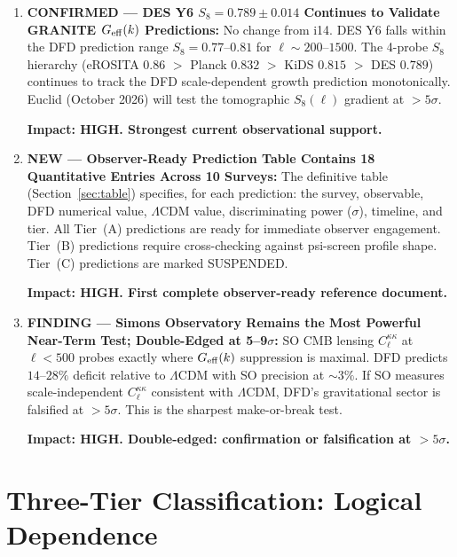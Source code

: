 \documentclass[11pt,a4paper]{article}
\newcommand{\LCDM}{$\Lambda$CDM}
\newcommand{\Geff}{G_{\rm eff}}
\begin{document}
\begin{findbox}
\begin{enumerate}
  \textbf{Impact: CRITICAL. The decisive falsification/confirmation test.}

\item \textbf{CONFIRMED --- DES Y6 $S_8 = 0.789 \pm 0.014$ Continues
  to Validate GRANITE $\Geff(k)$ Predictions:}
  No change from i14. DES Y6 falls within the DFD prediction range
  $S_8 = 0.77$--$0.81$ for $\ell \sim 200$--$1500$. The 4-probe $S_8$
  hierarchy (eROSITA $0.86$ $>$ Planck $0.832$ $>$ KiDS $0.815$ $>$
  DES $0.789$) continues to track the DFD scale-dependent growth
  prediction monotonically. Euclid (October 2026) will test the
  tomographic $S_8(\ell)$ gradient at $> 5\sigma$.

  \textbf{Impact: HIGH. Strongest current observational support.}

\item \textbf{NEW --- Observer-Ready Prediction Table Contains 18
  Quantitative Entries Across 10 Surveys:}
  The definitive table (Section~\ref{sec:table}) specifies, for each
  prediction: the survey, observable, DFD numerical value, \LCDM{}
  value, discriminating power ($\sigma$), timeline, and tier. All
  Tier~(A) predictions are ready for immediate observer engagement.
  Tier~(B) predictions require cross-checking against psi-screen
  profile shape. Tier~(C) predictions are marked SUSPENDED.

  \textbf{Impact: HIGH. First complete observer-ready reference document.}

\item \textbf{FINDING --- Simons Observatory Remains the Most Powerful
  Near-Term Test; Double-Edged at 5--9$\sigma$:}
  SO CMB lensing $C_\ell^{\kappa\kappa}$ at $\ell < 500$ probes
  exactly where $\Geff(k)$ suppression is maximal. DFD predicts
  $14$--$28\%$ deficit relative to \LCDM{} with SO precision at
  $\sim 3\%$. If SO measures scale-independent $C_\ell^{\kappa\kappa}$
  consistent with \LCDM{}, DFD's gravitational sector is falsified at
  $> 5\sigma$. This is the sharpest make-or-break test.

  \textbf{Impact: HIGH. Double-edged: confirmation or falsification
  at $> 5\sigma$.}

\end{enumerate}
\end{findbox}


\section{Three-Tier Classification: Logical Dependence}
\label{sec:tiers}
\end{document}
